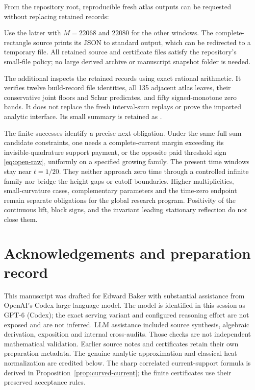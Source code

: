 \documentclass[11pt]{article}
\numberwithin{equation}{section}
\theoremstyle{definition}
\theoremstyle{remark}
\begin{document}
From the repository root, reproducible fresh atlas outputs can be
requested without replacing retained records:
\begin{quote}\small
{}

\end{quote}
Use the latter with $M=22068$ and $22080$ for the other windows.
The complete-rectangle source prints its JSON to standard output,
which can be redirected to a temporary file. All retained source and
certificate files satisfy the repository's small-file policy; no
large derived archive or manuscript snapshot folder is needed.

The additional  inspects
the retained records using exact rational arithmetic. It verifies twelve
build-record file identities, all 135 adjacent atlas leaves, their
conservative joint floors and Schur predicates, and fifty signed-monotone
zero bands. It does not replace the fresh interval-sum replays or prove
the imported analytic interface. Its small summary is retained as
.

The finite successes identify a precise next obligation. Under the
same full-sum candidate constraints, one needs a complete-current
margin exceeding its invisible-quadrature support payment, or the
opposite paid threshold sign \eqref{eq:open-raw}, uniformly on a
specified growing family. The present time windows stay near
$t=1/20$. They neither approach zero time through a controlled
infinite family nor bridge the height gaps or cutoff boundaries.
Higher multiplicities, small-curvature cases, complementary
parameters and the time-zero endpoint remain separate obligations
for the global research program. Positivity of the continuous lift,
block signs, and the invariant leading stationary reflection do not
close them.

\section*{Acknowledgements and preparation record}
This manuscript was drafted for Edward Baker with substantial assistance
from OpenAI's Codex large language model. The model is identified in this
session as GPT-6 (Codex); the exact serving variant and configured
reasoning effort are not exposed and are not inferred. LLM assistance
included source synthesis, algebraic derivation, exposition and internal
cross-audits. Those checks are not independent mathematical validation.
Earlier source notes and certificates retain their own preparation
metadata. The genuine analytic approximation and classical heat
normalization are credited below. The sharp correlated current-support
formula is derived in Proposition~\ref{prop:curved-current}; the finite
certificates use their preserved acceptance rules.
\end{document}
